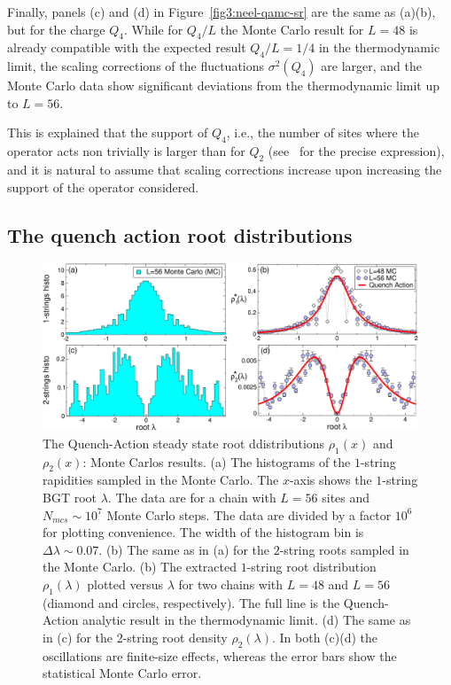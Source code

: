\documentclass[11pt]{iopart}
\begin{document}
Finally, panels (c) and (d) in Figure~\ref{fig3:neel-qamc-sr} are the same as 
(a)(b), but for the charge $Q_4$. While for $Q_4/L$ the Monte Carlo result 
for $L=48$ is already compatible with the expected result $Q_4/L=1/4$ in the 
thermodynamic limit, the scaling corrections of the fluctuations $\sigma^2(Q_4)$ 
are larger, and the Monte Carlo data show significant deviations from the 
thermodynamic limit up to $L=56$. 

This is explained that the support of $Q_4$, i.e., the number of sites where 
the operator acts non trivially is larger than for $Q_2$ (see~\cite{grabowski-1995} 
for the precise expression), and it is natural 
to assume that scaling corrections increase upon increasing the support of the 
operator considered. 

\subsection{The quench action root distributions}
\label{sec:6.3}

\begin{figure}[t]
\begin{center}
\includegraphics[width=.95\textwidth]{./draft_figs/Neel_rho}
\end{center}
\caption{ The Quench-Action steady state root ddistributions $\rho_1(x)$ 
 and $\rho_2(x)$: Monte Carlos results. (a) The histograms of the $1$-string 
 rapidities sampled in the Monte Carlo. The $x$-axis shows the $1$-string BGT 
 root $\lambda$. The data are for a chain with $L=56$ sites and $N_{mcs}\sim 
 10^7$ Monte Carlo steps. The data are divided by a factor $10^6$ for plotting 
 convenience. The width of the histogram bin is $\Delta\lambda\sim 0.07$. (b) 
 The same as in (a) for the $2$-string roots sampled in the Monte Carlo. (b) 
 The extracted $1$-string root distribution $\rho_1(\lambda)$ plotted versus 
 $\lambda$ for two chains with $L=48$ and $L=56$ (diamond and circles, respectively). 
 The full line is the Quench-Action analytic result in the thermodynamic limit. (d) 
 The same as in (c) for the $2$-string root density $\rho_2(\lambda)$. In both 
 (c)(d) the oscillations are finite-size effects, whereas the error bars 
 show the statistical Monte Carlo error. 
}
\label{fig4:neel-rho}
\end{figure}
\end{document}
